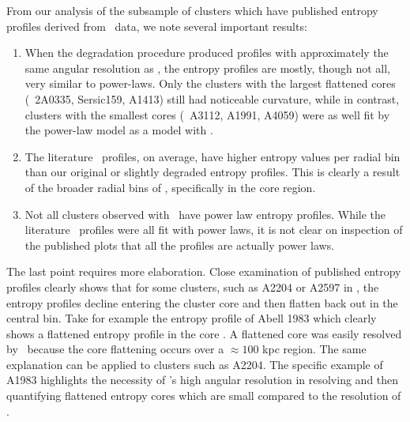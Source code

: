 \documentclass{emulateapj}
\begin{document}
From our analysis of the subsample of clusters which have published
entropy profiles derived from \xmm\ data, we note several important
results:
\begin{enumerate}
\item When the degradation procedure produced profiles with
  approximately the same angular resolution as \xmm, the entropy
  profiles are mostly, though not all, very similar to
  power-laws. Only the clusters with the largest flattened cores
  (\eg\ 2A0335, Sersic159, A1413) still had noticeable curvature,
  while in contrast, clusters with the smallest cores (\eg\ A3112,
  A1991, A4059) were as well fit by the power-law model as a model
  with \kna.
\item The literature \xmm\ profiles, on average, have higher entropy
  values per radial bin than our original or slightly degraded
  entropy profiles. This is clearly a result of the broader radial
  bins of \xmm, specifically in the core region.
\item Not all clusters observed with \xmm\ have power law entropy
  profiles. While the literature \xmm\ profiles were all fit with
  power laws, it is not clear on inspection of the published plots
  that all the profiles are actually power laws.
\end{enumerate}
The last point requires more elaboration. Close examination of
published entropy profiles clearly shows that for some clusters, such
as A2204 or A2597 in \citet{pratt06}, the entropy profiles decline
entering the cluster core and then flatten back out in the central
bin. Take for example the entropy profile of Abell 1983 which clearly
shows a flattened entropy profile in the core
\citep{2003A&A...408....1P}. A flattened core was easily resolved by
\xmm\ because the core flattening occurs over a $\approx 100$ kpc
region. The same explanation can be applied to clusters such as
A2204. The specific example of A1983 highlights the necessity of
\chandra's high angular resolution in resolving and then quantifying
flattened entropy cores which are small compared to the resolution of
\xmm.

\end{document}
